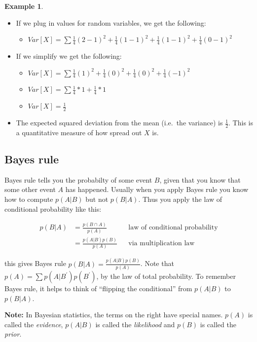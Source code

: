 \documentclass[]{article}
\theoremstyle{definition}
\newtheorem{exmp}{Example}[section]
\begin{document}
\begin{exmp}
\begin{itemize}
\begin{itemize}
   \end{itemize}
\item If we plug in values for random variables, we get the following: 
  \begin{itemize}
   \item[] $Var[X] =  \sum \frac{1}{4} (2 -1)^2 +  \frac{1}{4} (1 -1)^2 +   \frac{1}{4}(1 -1)^2 +  \frac{1}{4}(0 -1)^2$
   \end{itemize}
\item If we simplify we get the following:
 	 \begin{itemize}
   	\item[] $Var[X] =  \sum \frac{1}{4} (1)^2 +  \frac{1}{4} (0)^2 +   \frac{1}{4}(0)^2 +  \frac{1}{4}(-1)^2$
   	\item[] $Var[X] =  \sum \frac{1}{4} * 1 +  \frac{1}{4} * 1$
   	\item[] $Var[X] = \frac{1}{2}$
   	\end{itemize}
\item The expected squared deviation from the mean (i.e.\ the variance) is $\frac{1}{2}$. This is a quantitative measure of how spread out $X$ is.
\end{itemize}

\end{exmp} 

\subsection{Bayes rule}\label{s:bayes}

Bayes rule tells you the probabilty of some event $B$, given that you know that some other event $A$ has happened. Usually when you apply Bayes rule you know how to compute $p(A|B)$ but not $p(B|A)$. Thus you apply the law of conditional probability like this: 

\begin{align*}
p(B \vert A) &= \frac{p(B \cap A)}{p(A)} && \text{law of conditional probability} \\
       &= \frac{p(A \vert B)p(B)}{p(A)} && \text{via multiplication law}
\end{align*}

\noindent this gives Bayes rule $p(B \vert A) = \frac{p(A \vert B)p(B)}{p(A)}$. Note that $p(A) = \sum p(A|B^\prime)p(B^\prime)$, by the law of total probability. To remember Bayes rule, it helps to think of ``flipping the conditional'' from $p(A \vert B)$ to $p(B \vert A)$. 


\textbf{Note:} In Bayesian statistics, the terms on the right have special names. $p(A)$ is called the \textit{evidence}, $p(A \vert B)$ is called the \textit{likelihood} and $p(B)$ is called the \textit{prior}. 
\end{document}

